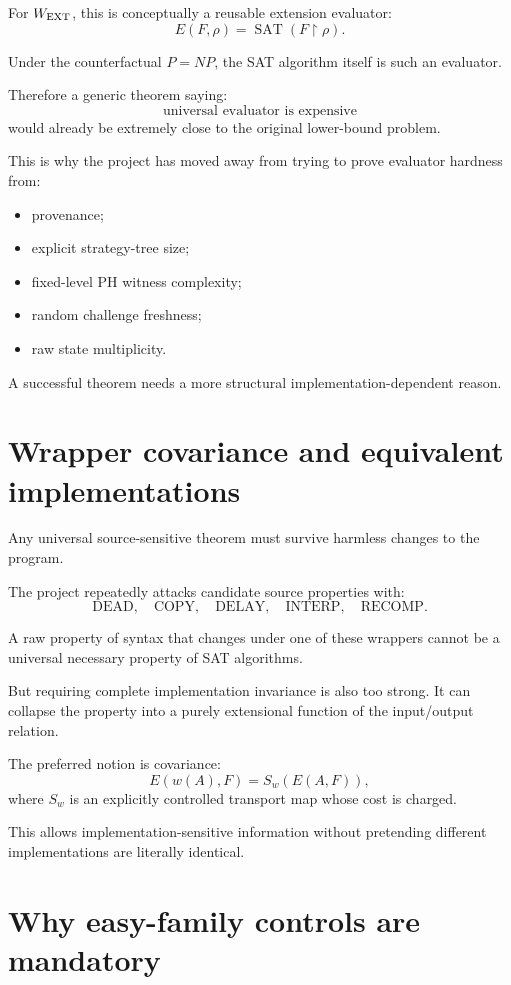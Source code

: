 \documentclass[11pt]{article}
\theoremstyle{plain}
\theoremstyle{definition}
\theoremstyle{remark}
\begin{document}
For \(W_{\rm EXT}\), this is conceptually a reusable extension evaluator:
\[
E(F,\rho)
=
\operatorname{SAT}(F\upharpoonright\rho).
\]

Under the counterfactual \(P=NP\), the SAT algorithm itself is such an
evaluator.

Therefore a generic theorem saying:
\[
\text{universal evaluator is expensive}
\]
would already be extremely close to the original lower-bound problem.

This is why the project has moved away from trying to prove evaluator hardness
from:
\begin{itemize}[leftmargin=1.4em]
\item provenance;
\item explicit strategy-tree size;
\item fixed-level PH witness complexity;
\item random challenge freshness;
\item raw state multiplicity.
\end{itemize}

A successful theorem needs a more structural implementation-dependent reason.

\section{Wrapper covariance and equivalent implementations}

Any universal source-sensitive theorem must survive harmless changes to the
program.

The project repeatedly attacks candidate source properties with:
\[
\text{DEAD},\quad
\text{COPY},\quad
\text{DELAY},\quad
\text{INTERP},\quad
\text{RECOMP}.
\]

A raw property of syntax that changes under one of these wrappers cannot be a
universal necessary property of SAT algorithms.

But requiring complete implementation invariance is also too strong.  It can
collapse the property into a purely extensional function of the input/output
relation.

The preferred notion is covariance:
\[
E(w(A),F)
=
S_w(E(A,F)),
\]
where \(S_w\) is an explicitly controlled transport map whose cost is charged.

This allows implementation-sensitive information without pretending different
implementations are literally identical.

\section{Why easy-family controls are mandatory}
\end{document}

